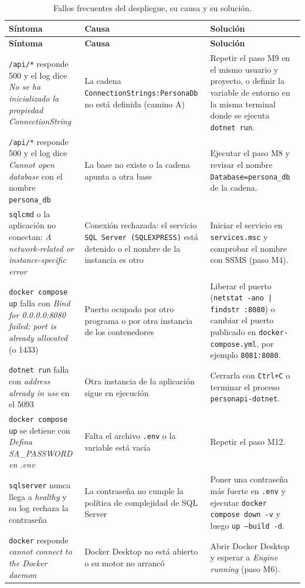 \documentclass[12pt,letterpaper]{article}
\begin{document}
\begin{longtable}{>{\raggedright\arraybackslash}p{4.4cm} >{\raggedright\arraybackslash}p{4.8cm} >{\raggedright\arraybackslash}p{5.4cm}}
\caption{Fallos frecuentes del despliegue, su causa y su solución.}\label{tab:manual-fallos}\\
\toprule
\textbf{Síntoma} & \textbf{Causa} & \textbf{Solución} \\
\midrule
\endfirsthead
\toprule
\textbf{Síntoma} & \textbf{Causa} & \textbf{Solución} \\
\midrule
\endhead
\texttt{/api/*} responde 500 y el log dice \emph{No se ha inicializado la propiedad
ConnectionString} &
La cadena \texttt{ConnectionStrings:}\allowbreak\texttt{PersonaDb} no está definida
(camino A) &
Repetir el paso M9 en el mismo usuario y proyecto, o definir la variable de entorno en
la misma terminal donde se ejecuta \texttt{dotnet run}. \\
\midrule
\texttt{/api/*} responde 500 y el log dice \emph{Cannot open database} con el nombre \texttt{persona\_db} &
La base no existe o la cadena apunta a otra base &
Ejecutar el paso M8 y revisar el nombre \texttt{Database=persona\_db} de la cadena. \\
\midrule
\texttt{sqlcmd} o la aplicación no conectan: \emph{A network-related or
instance-specific error} &
Conexión rechazada: el servicio \texttt{SQL Server (SQLEXPRESS)} está detenido o el
nombre de la instancia es otro &
Iniciar el servicio en \texttt{services.msc} y comprobar el nombre con SSMS
(paso M4). \\
\midrule
\texttt{docker compose up} falla con \emph{Bind for 0.0.0.0:8080 failed: port is already
allocated} (o 1433) &
Puerto ocupado por otro programa o por otra instancia de los contenedores &
Liberar el puerto (\texttt{netstat -ano | findstr :8080}) o cambiar el puerto
publicado en \texttt{docker-compose.yml}, por ejemplo \texttt{8081:8080}. \\
\midrule
\texttt{dotnet run} falla con \emph{address already in use} en el 5093 &
Otra instancia de la aplicación sigue en ejecución &
Cerrarla con \texttt{Ctrl+C} o terminar el proceso \texttt{personapi-dotnet}. \\
\midrule
\texttt{docker compose up} se detiene con \emph{Defina SA\_PASSWORD en .env} &
Falta el archivo \texttt{.env} o la variable está vacía &
Repetir el paso M12. \\
\midrule
\texttt{sqlserver} nunca llega a \emph{healthy} y su log rechaza la contraseña &
La contraseña no cumple la política de complejidad de SQL Server &
Poner una contraseña más fuerte en \texttt{.env} y ejecutar
\texttt{docker compose down -v} y luego \texttt{up --build -d}. \\
\midrule
\texttt{docker} responde \emph{cannot connect to the Docker daemon} &
Docker Desktop no está abierto o su motor no arrancó &
Abrir Docker Desktop y esperar a \emph{Engine running} (paso M6). \\
\bottomrule
\end{longtable}
\end{document}
